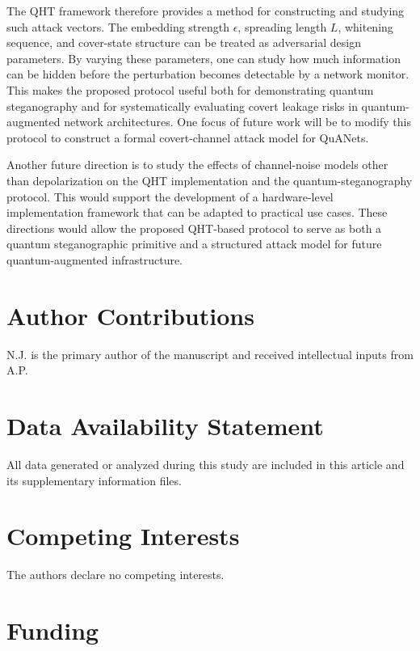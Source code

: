 \documentclass[11pt]{article}
\theoremstyle{plain}
\theoremstyle{definition}
\theoremstyle{remark}
\begin{document}
The QHT framework therefore provides a method for constructing and studying such attack vectors. The embedding strength $\epsilon$, spreading length $L$, whitening sequence, and cover-state structure can be treated as adversarial design parameters. By varying these parameters, one can study how much information can be hidden before the perturbation becomes detectable by a network monitor. This makes the proposed protocol useful both for demonstrating quantum steganography and for systematically evaluating covert leakage risks in quantum-augmented network architectures. One focus of future work will be to modify this protocol to construct a formal covert-channel attack model for QuANets.

Another future direction is to study the effects of channel-noise models other than depolarization on the QHT implementation and the quantum-steganography protocol. This would support the development of a hardware-level implementation framework that can be adapted to practical use cases. These directions would allow the proposed QHT-based protocol to serve as both a quantum steganographic primitive and a structured attack model for future quantum-augmented infrastructure.




\section*{Author Contributions}

N.J. is the primary author of the manuscript and received intellectual inputs from A.P.

\section*{Data Availability Statement}

All data generated or analyzed during this study are included in this article and its supplementary information files.

\section*{Competing Interests}

The authors declare no competing interests.

\section*{Funding}
\end{document}
